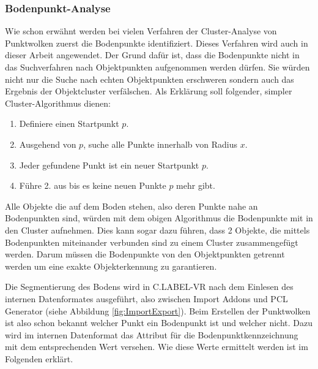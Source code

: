 \subsubsection{Bodenpunkt-Analyse}
Wie schon erwähnt werden bei vielen Verfahren der Cluster-Analyse von Punktwolken zuerst die Bodenpunkte identifiziert. Dieses Verfahren wird auch in dieser Arbeit angewendet. Der Grund dafür ist, dass die Bodenpunkte nicht in das Suchverfahren nach Objektpunkten aufgenommen werden dürfen. Sie würden nicht nur die Suche nach echten Objektpunkten erschweren sondern auch das Ergebnis der Objektcluster verfälschen. Als Erklärung soll folgender, simpler Cluster-Algorithmus dienen:

\begin{enumerate}
\item Definiere einen Startpunkt $p$.
\item Ausgehend von $p$, suche alle Punkte innerhalb von Radius \(x\). 
\item Jeder gefundene Punkt ist ein neuer Startpunkt $p$.
\item Führe 2. aus bis es keine neuen Punkte $p$ mehr gibt.
\end{enumerate} 

Alle Objekte die auf dem Boden stehen, also deren Punkte nahe an Bodenpunkten sind, würden mit dem obigen Algorithmus die Bodenpunkte mit in den Cluster aufnehmen. Dies kann sogar dazu führen, dass 2 Objekte, die mittels Bodenpunkten miteinander verbunden sind zu einem Cluster zusammengefügt werden. Darum müssen die Bodenpunkte von den Objektpunkten getrennt werden um eine exakte Objekterkennung zu garantieren.

Die Segmentierung des Bodens wird in C.LABEL-VR nach dem Einlesen des internen Datenformates ausgeführt, also zwischen Import Addons und PCL Generator (siehe Abbildung \ref{fig:ImportExport}). Beim Erstellen der Punktwolken ist also schon bekannt welcher Punkt ein Bodenpunkt ist und welcher nicht. Dazu wird im internen Datenformat das Attribut für die Bodenpunktkennzeichnung mit dem entsprechenden Wert versehen. Wie diese Werte ermittelt werden ist im Folgenden erklärt.\\

